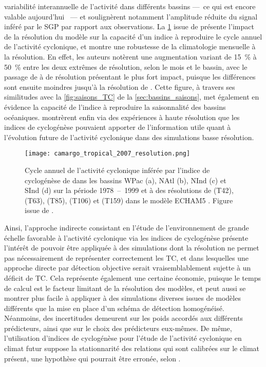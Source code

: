\documentclass[../main.tex]{subfiles}
\begin{document}
variabilité interannuelle de l'activité dans différents bassins ---~ce qui est encore valable aujourd'hui
\parencite{camargo_tropical_2007,menkes_comparison_2012,cavicchia_tropical_2023a}~--- et soulignèrent notamment l'amplitude réduite du signal inféré par le SGP
par rapport aux observations. La \cref{fig:GP_resolution} issue de \textcite{camargo_tropical_2007} présente l'impact de la résolution du modèle sur la capacité
d'un indice à reproduire le cycle annuel de l'activité cyclonique, et montre une robustesse de la climatologie mensuelle à la résolution. En effet, les auteurs
notèrent une augmentation variant de \SI{15}{\percent} à \SI{50}{\percent} entre les deux extrêmes de résolution, selon le mois et le bassin, avec le passage de
 à  de résolution présentant le plus fort impact, puisque les différences sont ensuite moindres jusqu'à la résolution de . Cette figure,
à travers ses similitudes avec la \cref{fig:saisons_TC} de la \cref{sec:bassins_saisons}, met également en évidence la capacité de l'indice à reproduire la
saisonnalité des bassins océaniques. \textcite{mcdonald_tropical_2005,chauvin_response_2006} montrèrent enfin via des expériences à haute résolution que les
indices de cyclogénèse pouvaient apporter de l'information utile quant à l'évolution future de l'activité cyclonique dans des simulations basse résolution.

\begin{figure}[tb]
    \centering
    \texttt{[image: camargo\_tropical\_2007\_resolution.png]}
    \caption{Cycle annuel de l'activité cyclonique inférée par l'indice de cyclogénèse de \textcite{emanuel_tropical_2004} dans les bassins WPac (a), NAtl (b), NInd
    (c) et SInd (d) sur la période \num{1978}~--~\num{1999} et à des résolutions de  (T42),  (T63),  (T85),  (T106) et 
    (T159) dans le modèle ECHAM5 \parencite{roeckner_atmospheric_2003}. Figure issue de \textcite{camargo_tropical_2007}.}
    \label{fig:GP_resolution}
\end{figure}

Ainsi, l'approche indirecte consistant en l'étude de l'environnement de grande échelle favorable à l'activité cyclonique via les indices de cyclogénèse présente
l'intérêt de pouvoir être appliquée à des simulations dont la résolution ne permet pas nécessairement de représenter correctement les TC, et dans lesquelles une
approche directe par détection objective serait vraisemblablement sujette à un déficit de TC. Cela représente également une certaine économie, puisque le temps
de calcul est le facteur limitant de la résolution des modèles, et peut aussi se montrer plus facile à appliquer à des simulations diverses issues de modèles
différents que la mise en place d'un schéma de détection homogénéisé. Néanmoins, des incertitudes demeurent sur les poids accordés aux différents prédicteurs,
ainsi que sur le choix des prédicteurs eux-mêmes. De même, l'utilisation d'indices de cyclogénèse pour l'étude de l'activité cyclonique en climat futur suppose
la stationnarité des relations qui sont calibrées sur le climat présent, une hypothèse qui pourrait être erronée, selon
\textcite{nolan_increased_2008,murakami_changes_2013}.
\end{document}
